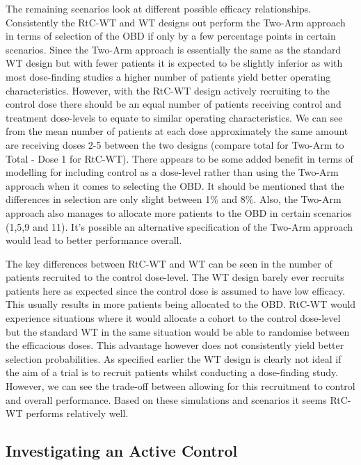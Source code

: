  The remaining scenarios look at different possible efficacy relationships. Consistently the RtC-WT and WT designs out perform the Two-Arm approach in terms of selection of the OBD if only by a few percentage points in certain scenarios. Since the Two-Arm approach is essentially the same as the standard WT design but with fewer patients it is expected to be slightly inferior as with most dose-finding studies a higher number of patients yield better operating characteristics. However, with the RtC-WT design actively recruiting to the control dose there should be an equal number of patients receiving control and treatment dose-levels to equate to similar operating characteristics. We can see from the mean number of patients at each dose approximately the same amount are receiving doses 2-5 between the two designs (compare total for Two-Arm to Total - Dose 1 for RtC-WT). There appears to be some added benefit in terms of modelling for including control as a dose-level rather than using the Two-Arm approach when it comes to selecting the OBD. It should be mentioned that the differences in selection are only slight between 1\% and 8\%. Also, the Two-Arm approach also manages to allocate more patients to the OBD in certain scenarios (1,5,9 and 11). It's possible an alternative specification of the Two-Arm approach would lead to better performance overall. 
 
 The key differences between RtC-WT and WT can be seen in the number of patients recruited to the control dose-level. The WT design barely ever recruits patients here as expected since the control dose is assumed to have low efficacy. This usually results in more patients being allocated to the OBD. RtC-WT would experience situations where it would allocate a cohort to the control dose-level but the standard WT in the same situation would be able to randomise between the efficacious doses. This advantage however does not consistently yield better selection probabilities. As specified earlier the WT design is clearly not ideal if the aim of a trial is to recruit patients whilst conducting a dose-finding study. However, we can see the trade-off between allowing for this recruitment to control and overall performance. Based on these simulations and scenarios it seems RtC-WT performs relatively well. 
 
   
 \subsection{Investigating an Active Control}
 \label{WT:InvesActiveCon}
 
